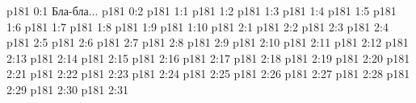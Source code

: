 \author{Промежуточные создания}
\vs p181 0:1  Бла-бла...
\vs p181 0:2 
\vs p181 1:1 
\vs p181 1:2 
\vs p181 1:3 
\vs p181 1:4 
\vs p181 1:5 
\vs p181 1:6 
\vs p181 1:7 \pc 
\vs p181 1:8 
\vs p181 1:9 
\vs p181 1:10 
\vs p181 2:1 
\vs p181 2:2 \pc 
\vs p181 2:3 
\vs p181 2:4 
\vs p181 2:5 
\vs p181 2:6 \pc 
\vs p181 2:7 \pc 
\vs p181 2:8 
\vs p181 2:9 
\vs p181 2:10 
\vs p181 2:11 \pc 
\vs p181 2:12 \pc 
\vs p181 2:13 
\vs p181 2:14 
\vs p181 2:15 \pc 
\vs p181 2:16 \pc 
\vs p181 2:17 
\vs p181 2:18 
\vs p181 2:19 \pc 
\vs p181 2:20 \pc 
\vs p181 2:21 \pc 
\vs p181 2:22 
\vs p181 2:23 
\vs p181 2:24 
\vs p181 2:25 
\vs p181 2:26 \pc 
\vs p181 2:27 \pc 
\vs p181 2:28 
\vs p181 2:29 
\vs p181 2:30 
\vs p181 2:31 \pc 
\quizlink
